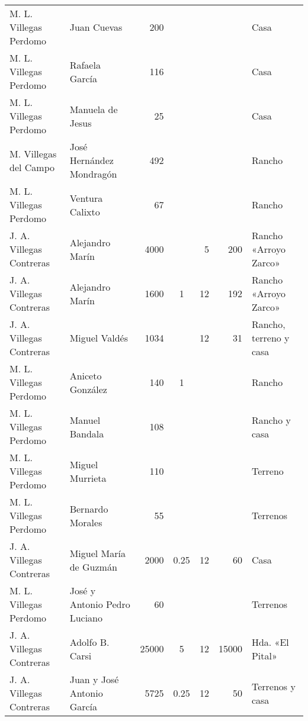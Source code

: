 \documentclass[14pt,twoside,final]{extbook} %
\begin{document}
{\begin{longtable}[c]{@{}p{2.5cm}lrSrrl@{}}
M. L. Villegas Perdomo & Juan Cuevas & 200 & {} & {} & {} & Casa \\
M. L. Villegas Perdomo & Rafaela García & 116 & {} & {} & {} & Casa \\
M. L. Villegas Perdomo & Manuela de Jesus & 25 & {} & {} & {} & Casa \\
M. Villegas del Campo & José Hernández Mondragón & 492 & {} & {} & {} & Rancho \\
M. L. Villegas Perdomo & Ventura Calixto & 67 & {} & {} & {} & Rancho \\
J. A. Villegas Contreras & Alejandro Marín & 4000 & {} & 5 & 200 & Rancho «Arroyo Zarco» \\
J. A. Villegas Contreras & Alejandro Marín & 1600 & 1 & 12 & 192 & Rancho «Arroyo Zarco» \\
J. A. Villegas Contreras & Miguel Valdés & 1034 & {} & 12 & 31 & Rancho, terreno y casa \\
M. L. Villegas Perdomo & Aniceto González & 140 & 1 & {} & {} & Rancho \\
M. L. Villegas Perdomo & Manuel Bandala & 108 & {} & {} & {} & Rancho y casa \\
M. L. Villegas Perdomo & Miguel Murrieta & 110 & {} & {} & {} & Terreno \\
M. L. Villegas Perdomo & Bernardo Morales & 55 & {} & {} & {} & Terrenos \\
J. A. Villegas Contreras & Miguel María de Guzmán & 2000 & 0.25 & 12 & 60 & Casa \\
M. L. Villegas Perdomo & José y Antonio Pedro Luciano & 60 & {} & {} & {} & Terrenos \\
J. A. Villegas Contreras & Adolfo B. Carsi & 25000 & 5 & 12 & 15000 & Hda. «El Pital» \\
J. A. Villegas Contreras & Juan y José Antonio García & 5725 & 0.25 & 12 & 50 & Terrenos y casa \\

\end{longtable}}
\end{document}
